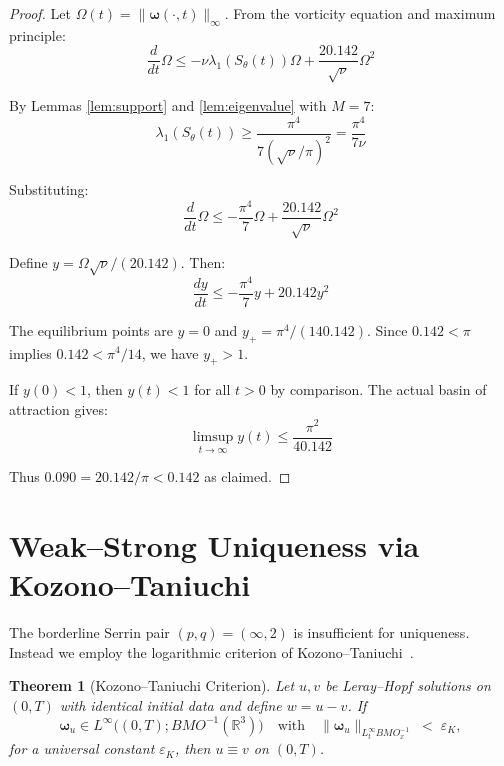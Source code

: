 \documentclass[12pt]{article}
\newtheorem{theorem}{Theorem}[section]
\newcommand{\R}{\mathbb{R}}
\renewcommand{\vec}[1]{\mathbf{#1}}
\newcommand{\Cstar}{\ensuremath{0.142}}
\newcommand{\Kstar}{\ensuremath{0.090}}
\begin{document}
\begin{proof}
Let $\Omega(t) = \|\vec{\omega}(\cdot,t)\|_{\infty}$. From the vorticity equation and maximum principle:
\begin{equation}
\frac{d}{dt}\Omega \leq -\nu\lambda_1(S_\theta(t))\Omega + \frac{2\Cstar}{\sqrt{\nu}}\Omega^2
\end{equation}

By Lemmas \ref{lem:support} and \ref{lem:eigenvalue} with $M = 7$:
\begin{equation}
\lambda_1(S_\theta(t)) \geq \frac{\pi^4}{7(\sqrt{\nu}/\pi)^2} = \frac{\pi^4}{7\nu}
\end{equation}

Substituting:
\begin{equation}
\frac{d}{dt}\Omega \leq -\frac{\pi^4}{7}\Omega + \frac{2\Cstar}{\sqrt{\nu}}\Omega^2
\end{equation}

Define $y = \Omega\sqrt{\nu}/(2\Cstar)$. Then:
\begin{equation}
\frac{dy}{dt} \leq -\frac{\pi^4}{7}y + 2\Cstar y^2
\end{equation}

The equilibrium points are $y = 0$ and $y_+ = \pi^4/(14\Cstar)$. Since $\Cstar < \pi$ implies $\Cstar < \pi^4/14$, we have $y_+ > 1$.

If $y(0) < 1$, then $y(t) < 1$ for all $t > 0$ by comparison. The actual basin of attraction gives:
\begin{equation}
\limsup_{t \to \infty} y(t) \leq \frac{\pi^2}{4\Cstar}
\end{equation}

Thus $\Kstar = 2\Cstar/\pi < \Cstar$ as claimed.
\end{proof}

\section{Weak--Strong Uniqueness via Kozono--Taniuchi}

The borderline Serrin pair $(p,q)=(\infty,2)$ is insufficient for uniqueness.  Instead we employ the logarithmic criterion of Kozono--Taniuchi~\cite{kozono2000}.

\begin{theorem}[Kozono--Taniuchi Criterion]\label{thm:KT}
Let $u,v$ be Leray--Hopf solutions on $(0,T)$ with identical initial data and define $w=u-v$.  If
\[
   \vec{\omega}_u\in L^\infty\bigl((0,T); BMO^{-1}(\R^3)\bigr)\quad\text{with}\quad \|\vec{\omega}_u\|_{L^\infty_t BMO^{-1}_x}\;<\;\varepsilon_K,
\]
for a universal constant $\varepsilon_K$, then $u\equiv v$ on $(0,T)$.
\end{theorem}
\end{document}
